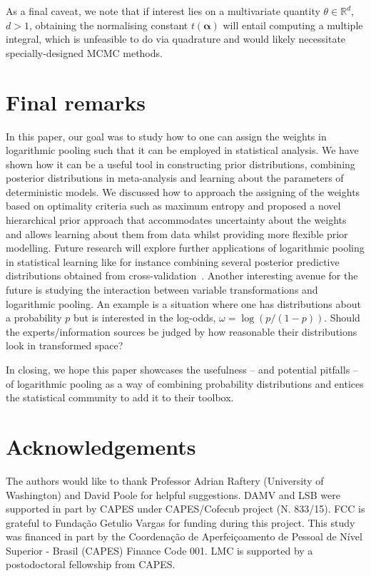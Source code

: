 \documentclass[a4paper, notitlepage, 10pt]{article}
\begin{document}
As a final caveat, we note that if interest lies on a multivariate quantity $\theta \in \mathbb{R}^d$, $d>1$, obtaining the normalising constant $t(\boldsymbol\alpha)$ will entail computing a multiple integral, which is unfeasible to do via quadrature and would likely necessitate specially-designed MCMC methods.

\section{Final remarks}
\label{sec:conclusion}

In this paper, our goal was to study how to one can assign the weights in logarithmic pooling such that it can be employed in statistical analysis.
We have shown how it can be a useful tool in constructing prior distributions, combining posterior distributions in meta-analysis and learning about the parameters of deterministic models.
We discussed how to approach the assigning of the weights based on optimality criteria such as maximum entropy and proposed a novel hierarchical prior approach that accommodates uncertainty about the weights and allows learning about them from data whilst providing more flexible prior modelling.
Future research will explore further applications of logarithmic pooling in statistical learning like for instance combining several posterior predictive distributions obtained from cross-validation~\citep{Yao2018}.
Another interesting avenue for the future is studying the interaction between variable transformations and logarithmic pooling.
An example is a situation where one has distributions about a probability $p$ but is interested in the log-odds, $\omega = \log(p/(1-p))$.
Should the experts/information sources be judged by how reasonable their distributions look in transformed space?

In closing, we hope this paper showcases the usefulness -- and potential pitfalls -- of logarithmic pooling as a way of combining probability distributions and entices the statistical community to add it to their toolbox.


\section*{Acknowledgements}
The authors would like to thank Professor Adrian Raftery (University of Washington) and David Poole for helpful suggestions.
DAMV and LSB were supported in part by CAPES under CAPES/Cofecub project (N. 833/15).
FCC is grateful to Funda\c{c}\~ao Getulio Vargas for funding during this 
project.
This study was financed in part by the Coordenação de Aperfeiçoamento de Pessoal de Nível Superior - Brasil (CAPES) Finance Code 001.
LMC is supported by a postodoctoral fellowship from CAPES.

\end{document}
